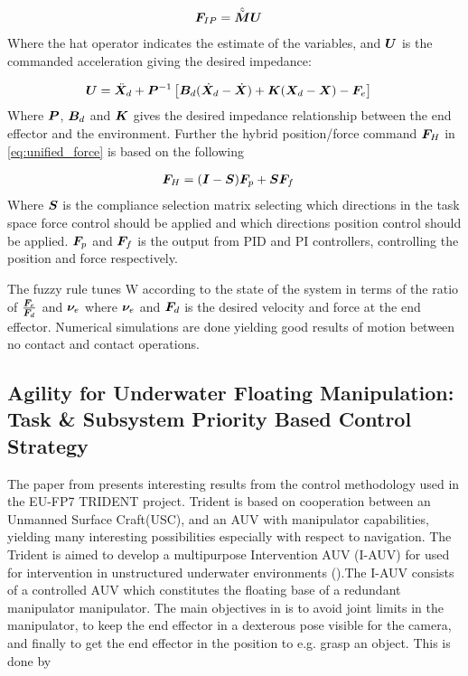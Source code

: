 \begin{align}
  \bs  F_{IP} &= \hat{\tilde{\bs M}}\bs U %
  \label{eq:impedance_control}
\end{align}
Where the hat operator indicates the estimate of the variables, and $\boldsymbol U$ is the commanded acceleration giving the desired impedance:

\begin{align}
  \boldsymbol U&=\ddot{\boldsymbol X}_d + \boldsymbol P^{-1}\left[ \boldsymbol B_d(\dot{\boldsymbol X}_d-\dot{\boldsymbol X}) + \boldsymbol K(\boldsymbol X_d - \boldsymbol X) - \boldsymbol F_e\right]
  \label{eq:impedance_control2}
\end{align}
Where $\boldsymbol P$, $\boldsymbol B_d$ and $\boldsymbol K$ gives the desired impedance relationship between the end effector and the environment. Further the hybrid position/force command $\boldsymbol F_H$ in \eqref{eq:unified_force} is based on the following

\begin{align}
  \boldsymbol F_H&= (\boldsymbol I - \boldsymbol S)\boldsymbol F_p + \boldsymbol S \boldsymbol F_f
  \label{eq:hybrid1}
\end{align}
Where $\boldsymbol S$ is the compliance selection matrix selecting which directions in the task space force control should be applied and which directions position control should be applied. $\boldsymbol F_p$ and $\boldsymbol F_f$ is the output from PID and PI controllers, controlling the position and force respectively.


The fuzzy rule tunes W according to the state of the system in terms of the ratio of $\frac{\boldsymbol F_e}{\boldsymbol F_d}$  and $\boldsymbol \nu_e$ where $\boldsymbol \nu_e$ and $\boldsymbol F_d$ is the desired velocity and force at the end effector. 
Numerical simulations are done yielding good results of motion between no contact and contact operations. 





\subsection{Agility for Underwater Floating Manipulation: Task \& Subsystem Priority Based Control Strategy}
The paper from \cite{trident_1} presents interesting results from the control methodology used in the EU-FP7 TRIDENT project. Trident is based on cooperation between an Unmanned Surface Craft(USC), and an AUV with manipulator capabilities, yielding many interesting possibilities especially with respect to navigation. The Trident is aimed to develop a multipurpose Intervention AUV (I-AUV) for used for intervention in unstructured underwater environments (\cite{trident1}).The I-AUV consists of a controlled AUV which constitutes the floating base of a redundant manipulator manipulator.  The main objectives in \cite{trident_1} is to avoid joint limits in the manipulator, to keep the end effector in a dexterous pose visible for the camera, and finally to get the end effector in the position to e.g. grasp an object. This is done by  

\newcommand*{\mybox}[2]{\colorbox{#1!30}{\parbox{.98\linewidth}{#2}}}



